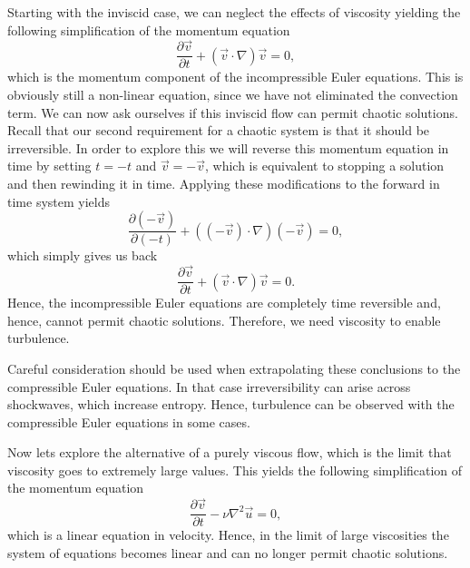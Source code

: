 Starting with the inviscid case, we can neglect the effects of viscosity yielding the following simplification of the momentum equation
\begin{equation}
	\frac{\partial \vec{v}}{\partial t} + \left(\vec{v} \cdot \nabla \right)\vec{v} = 0,
\end{equation}
which is the momentum component of the incompressible Euler equations. This is obviously still a non-linear equation, since we have not eliminated the convection term. We can now ask ourselves if this inviscid flow can permit chaotic solutions. Recall that our second requirement for a chaotic system is that it should be irreversible. In order to explore this we will reverse this momentum equation in time by setting $t=-t$ and $\vec{v} = -\vec{v}$, which is equivalent to stopping a solution and then rewinding it in time. Applying these modifications to the forward in time system yields
\begin{equation}
	\frac{\partial (-\vec{v})}{\partial (-t)} + \left((-\vec{v}) \cdot \nabla \right)(-\vec{v}) = 0,
\end{equation}
which simply gives us back
\begin{equation}
	\frac{\partial \vec{v}}{\partial t} + \left(\vec{v} \cdot \nabla \right)\vec{v} = 0.
\end{equation}
Hence, the incompressible Euler equations are completely time reversible and, hence, cannot permit chaotic solutions. Therefore, we need viscosity to enable turbulence.
\begin{remark}
Careful consideration should be used when extrapolating these conclusions to the compressible Euler equations. In that case irreversibility can arise across shockwaves, which increase entropy. Hence, turbulence can be observed with the compressible Euler equations in some cases.
\end{remark}

Now lets explore the alternative of a purely viscous flow, which is the limit that viscosity goes to extremely large values. This yields the following simplification of the momentum equation
\begin{equation}
	\frac{\partial \vec{v}}{\partial t} - \nu \nabla^2 \vec{u} = 0,
\end{equation}
which is a linear equation in velocity. Hence, in the limit of large viscosities the system of equations becomes linear and can no longer permit chaotic solutions.

